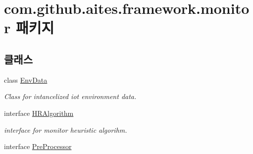 \hypertarget{namespacecom_1_1github_1_1aites_1_1framework_1_1monitor}{}\section{com.\+github.\+aites.\+framework.\+monitor 패키지}
\label{namespacecom_1_1github_1_1aites_1_1framework_1_1monitor}
\subsection*{클래스}
\begin{DoxyCompactItemize}
\item 
class \mbox{\hyperlink{classcom_1_1github_1_1aites_1_1framework_1_1monitor_1_1_env_data}{Env\+Data}}
\begin{DoxyCompactList}\small\item\em Class for intancelized iot environment data. \end{DoxyCompactList}\item 
interface \mbox{\hyperlink{interfacecom_1_1github_1_1aites_1_1framework_1_1monitor_1_1_h_r_algorithm}{H\+R\+Algorithm}}
\begin{DoxyCompactList}\small\item\em interface for monitor heuristic algorihm. \end{DoxyCompactList}\item 
interface \mbox{\hyperlink{interfacecom_1_1github_1_1aites_1_1framework_1_1monitor_1_1_pre_processor}{Pre\+Processor}}
\end{DoxyCompactItemize}
